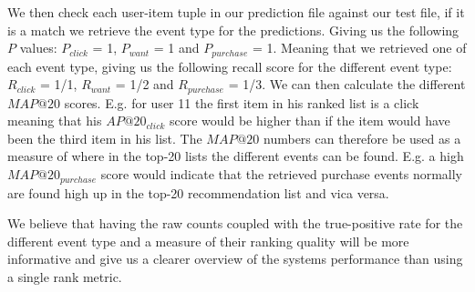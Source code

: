 We then check each user-item tuple in our prediction file against our test file, if it is a match we retrieve the
event type for the predictions. Giving us the following $P$ values: $P_{click}$ = 1, $P_{want}$ = 1 and $P_{purchase}$ = 1.
Meaning that we retrieved one of each event type, giving us the following recall score for the different event type:
$R_{click}$ = 1/1, $R_{want}$ = 1/2 and $R_{purchase}$ = 1/3. We can then calculate the different $MAP@20$ scores. E.g. for user 11
the first item in his ranked list is a click meaning that his $AP@20_{click}$ score would be higher than if the item
would have been the third item in his list. The $MAP@20$ numbers can therefore be used as a measure of where in the
top-20 lists the different events can be found. E.g. a high $MAP@20_{purchase}$ score would indicate that the retrieved
purchase events normally are found high up in the top-20 recommendation list and vica versa.

We believe that having the raw counts coupled with the true-positive rate for the different event type and a measure of their
ranking quality will be more informative and give us a clearer overview of the systems performance than using a single rank
metric.
